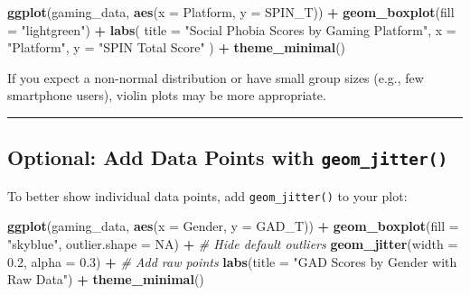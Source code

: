 \documentclass[
]{book}
\newenvironment{Shaded}{\begin{snugshade}}{\end{snugshade}}
\newcommand{\AttributeTok}[1]{\textcolor[rgb]{0.13,0.29,0.53}{#1}}
\newcommand{\CommentTok}[1]{\textcolor[rgb]{0.56,0.35,0.01}{\textit{#1}}}
\newcommand{\ConstantTok}[1]{\textcolor[rgb]{0.56,0.35,0.01}{#1}}
\newcommand{\FloatTok}[1]{\textcolor[rgb]{0.00,0.00,0.81}{#1}}
\newcommand{\FunctionTok}[1]{\textcolor[rgb]{0.13,0.29,0.53}{\textbf{#1}}}
\newcommand{\NormalTok}[1]{#1}
\newcommand{\SpecialCharTok}[1]{\textcolor[rgb]{0.81,0.36,0.00}{\textbf{#1}}}
\newcommand{\StringTok}[1]{\textcolor[rgb]{0.31,0.60,0.02}{#1}}
\begin{document}
\begin{Shaded}
\begin{Highlighting}[]
\FunctionTok{ggplot}\NormalTok{(gaming\_data, }\FunctionTok{aes}\NormalTok{(}\AttributeTok{x =}\NormalTok{ Platform, }\AttributeTok{y =}\NormalTok{ SPIN\_T)) }\SpecialCharTok{+}
  \FunctionTok{geom\_boxplot}\NormalTok{(}\AttributeTok{fill =} \StringTok{"lightgreen"}\NormalTok{) }\SpecialCharTok{+}
  \FunctionTok{labs}\NormalTok{(}
    \AttributeTok{title =} \StringTok{"Social Phobia Scores by Gaming Platform"}\NormalTok{,}
    \AttributeTok{x =} \StringTok{"Platform"}\NormalTok{,}
    \AttributeTok{y =} \StringTok{"SPIN Total Score"}
\NormalTok{  ) }\SpecialCharTok{+}
  \FunctionTok{theme\_minimal}\NormalTok{()}
\end{Highlighting}
\end{Shaded}

If you expect a non-normal distribution or have small group sizes (e.g., few smartphone users), violin plots may be more appropriate.

\begin{center}\rule{0.5\linewidth}{0.5pt}\end{center}

\subsection{\texorpdfstring{Optional: Add Data Points with \texttt{geom\_jitter()}}{Optional: Add Data Points with geom\_jitter()}}\label{optional-add-data-points-with-geom_jitter}

To better show individual data points, add \texttt{geom\_jitter()} to your plot:

\begin{Shaded}
\begin{Highlighting}[]
\FunctionTok{ggplot}\NormalTok{(gaming\_data, }\FunctionTok{aes}\NormalTok{(}\AttributeTok{x =}\NormalTok{ Gender, }\AttributeTok{y =}\NormalTok{ GAD\_T)) }\SpecialCharTok{+}
  \FunctionTok{geom\_boxplot}\NormalTok{(}\AttributeTok{fill =} \StringTok{"skyblue"}\NormalTok{, }\AttributeTok{outlier.shape =} \ConstantTok{NA}\NormalTok{) }\SpecialCharTok{+}  \CommentTok{\# Hide default outliers}
  \FunctionTok{geom\_jitter}\NormalTok{(}\AttributeTok{width =} \FloatTok{0.2}\NormalTok{, }\AttributeTok{alpha =} \FloatTok{0.3}\NormalTok{) }\SpecialCharTok{+}               \CommentTok{\# Add raw points}
  \FunctionTok{labs}\NormalTok{(}\AttributeTok{title =} \StringTok{"GAD Scores by Gender with Raw Data"}\NormalTok{) }\SpecialCharTok{+}
  \FunctionTok{theme\_minimal}\NormalTok{()}
\end{Highlighting}
\end{Shaded}
\end{document}
